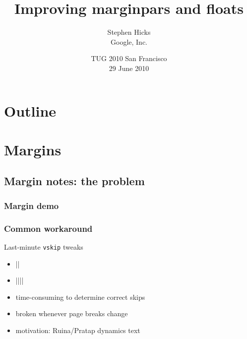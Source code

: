\documentclass{beamer}
\title{Improving marginpars and floats}
\author{Stephen Hicks\\Google, Inc.}
\date{TUG 2010 San Francisco\\29 June 2010}
\def\cs#1{\texttt{\expandafter\string\csname#1\endcsname}}
\begin{document}

\begin{frame}
  \titlepage
\end{frame}

\section*{Outline}
\begin{frame}
  \tableofcontents
\end{frame}

\section{Margins}
\subsection{Margin notes: the problem}
\begin{frame}
  \frametitle{Margin demo}
\end{frame}

\begin{frame}[fragile]
  \frametitle{Common workaround}
  \begin{block}{Last-minute \cs{vskip} tweaks}
    \begin{itemize}
    \item |\marginpar{|{\color{red}|\vskip-30pc|}\ldots|}|
    \item {\color{red}||}|\marginpar{|\ldots|}|
    \item time-consuming to determine correct skips
    \item broken whenever page breaks change
    \item motivation: Ruina/Pratap dynamics text
    \end{itemize}
  \end{block}
\end{frame}
\end{document}
